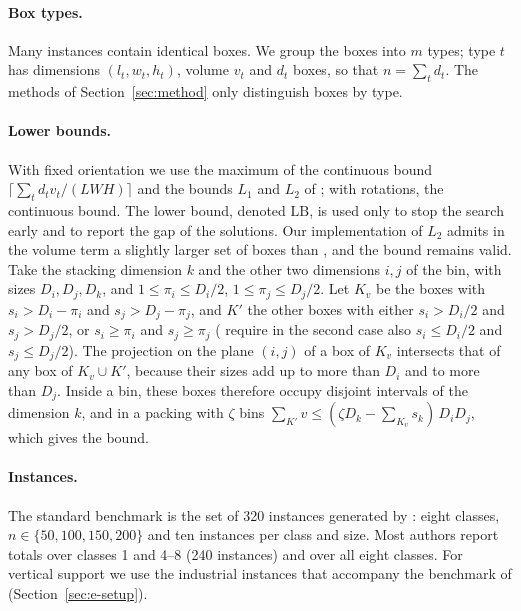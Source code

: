 \paragraph{Box types.}
Many instances contain identical boxes. We group the boxes into $m$ types; type $t$ has dimensions
$(l_t,w_t,h_t)$, volume $v_t$ and $d_t$ boxes, so that $n=\sum_t d_t$. The methods of
Section~\ref{sec:method} only distinguish boxes by type.

\paragraph{Lower bounds.}
With fixed orientation we use the maximum of the continuous bound
$\lceil \sum_t d_t v_t/(LWH)\rceil$ and the bounds $L_1$ and $L_2$ of \citet{Martello2000}; with
rotations, the continuous bound. The lower bound, denoted $\mathrm{LB}$, is used only to stop the search
early and to report the gap of the solutions.
Our implementation of $L_2$ admits in the volume term a slightly larger set of boxes than
\citet{Martello2000}, and the bound remains valid. Take the stacking dimension $k$ and the other two
dimensions $i,j$ of the bin, with sizes $D_i,D_j,D_k$, and $1\le \pi_i\le D_i/2$, $1\le \pi_j\le D_j/2$. Let
$K_v$ be the boxes with $s_i>D_i-\pi_i$ and $s_j>D_j-\pi_j$, and $K'$ the other boxes with either $s_i>D_i/2$ and
$s_j>D_j/2$, or $s_i\ge \pi_i$ and $s_j\ge \pi_j$ (\citet{Martello2000} require in the second case also
$s_i\le D_i/2$ and $s_j\le D_j/2$). The projection on the plane $(i,j)$ of a box of $K_v$ intersects that of
any box of $K_v\cup K'$, because their sizes add up to more than $D_i$ and to more than $D_j$. Inside a
bin, these boxes therefore occupy disjoint intervals of the dimension $k$, and in a packing with $\zeta$ bins
$\sum_{K'}v \le (\zeta D_k-\sum_{K_v}s_k)\,D_iD_j$, which gives the bound.

\paragraph{Instances.}
The standard benchmark is the set of 320 instances generated by \citet{Martello2000}: eight classes,
$n\in\{50,100,150,200\}$ and ten instances per class and size. Most authors report totals over
classes 1 and 4--8 (240 instances) and over all eight classes. For vertical support we use the
industrial instances that accompany the benchmark of \citet{Elhedhli2019} (Section~\ref{sec:e-setup}).
